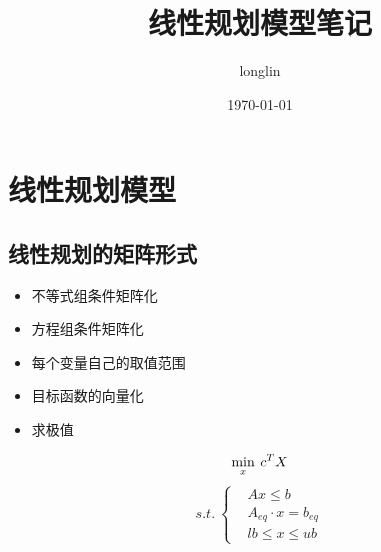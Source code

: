 \documentclass[12pt,a4paper]{article}
\title{线性规划模型笔记}
\author{longlin}
\date{\today}
\begin{document}
\maketitle

\section{线性规划模型}
\subsection{线性规划的矩阵形式}
\begin{itemize}
    \item 不等式组条件矩阵化
    \item 方程组条件矩阵化
    \item 每个变量自己的取值范围
    \item 目标函数的向量化
    \item 求极值
\end{itemize}

$$
\min_x \: c^T X \\
$$
\begin{equation}
    s.t. \:
    \begin{cases}
        & Ax \leq b \\
        & A_{eq} \cdot x = b_{eq} \\
        & lb \leq x \leq ub
    \end{cases}
\end{equation}
\end{document}
